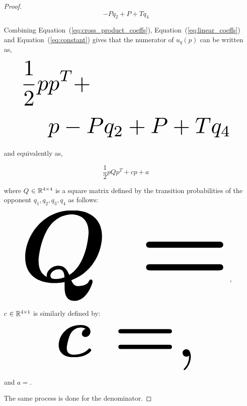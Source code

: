 \begin{proof}
\begin{equation}\label{eq:constant}
- P q_{2} + P + T q_{4}
\end{equation}

Combining Equation~(\ref{eq:cross_product_coeffs}), Equation~(\ref{eq:linear_coeffs}) and
Equation~(\ref{eq:constant}) gives that the numerator of \(u_q(p)\) can be written
as,

\begingroup
\boldmath
\begin{equation*}
\resizebox{0.9\textwidth}{!}{$ \begin{split}
    \frac{1}{2}p &  p^T +  \\
    &  p - P q_{2} + P + T q_{4}
\end{split} $}
\end{equation*}
\endgroup

and equivalently as,

\[\frac{1}{2}pQp^T + cp + a\]

where \(Q\) \(\in \mathbb{R}^{4\times4}\) is a square matrix defined by the
transition probabilities of the opponent \(q_1, q_2, q_3, q_4\) as follows:

\begin{equation*}
    \resizebox{0.9\linewidth}{!}{\arraycolsep=2.5pt%
    \boldmath\(
    Q = \)},
\end{equation*}

\(c\) \(\in \mathbb{R}^{4 \times 1}\) is similarly defined by:

\begin{equation*}
    \resizebox{0.6\linewidth}{!}{\arraycolsep=2.5pt%
    \boldmath\(c = \),}
\end{equation*}

and \(a = \).

The same process is done for the denominator.
\end{proof}